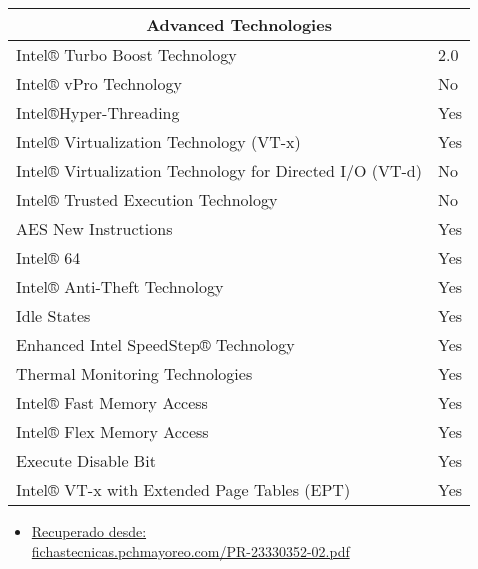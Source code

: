 \begin{table}[H]
  \begin{tabular}{ll}
  \hline
  \multicolumn{2}{|c|}{Advanced Technologies} \\ \hline
  \multicolumn{1}{|l|}{Intel® Turbo Boost Technology} & \multicolumn{1}{l|}{2.0} \\ \hline
  \multicolumn{1}{|l|}{Intel® vPro Technology} & \multicolumn{1}{l|}{No} \\ \hline
  \multicolumn{1}{|l|}{Intel®Hyper-Threading} & \multicolumn{1}{l|}{Yes} \\ \hline
  \multicolumn{1}{|l|}{Intel® Virtualization Technology (VT-x)} & \multicolumn{1}{l|}{Yes} \\ \hline
  \multicolumn{1}{|l|}{Intel® Virtualization Technology for Directed I/O (VT-d)} & \multicolumn{1}{l|}{No} \\ \hline
  \multicolumn{1}{|l|}{Intel® Trusted Execution Technology} & \multicolumn{1}{l|}{No} \\ \hline
  \multicolumn{1}{|l|}{AES New Instructions} & \multicolumn{1}{l|}{Yes} \\ \hline
  \multicolumn{1}{|l|}{Intel® 64} & \multicolumn{1}{l|}{Yes} \\ \hline
  \multicolumn{1}{|l|}{Intel® Anti-Theft Technology} & \multicolumn{1}{l|}{Yes} \\ \hline
  \multicolumn{1}{|l|}{Idle States} & \multicolumn{1}{l|}{Yes} \\ \hline
  \multicolumn{1}{|l|}{Enhanced Intel SpeedStep® Technology} & \multicolumn{1}{l|}{Yes} \\ \hline
  \multicolumn{1}{|l|}{Thermal Monitoring Technologies} & \multicolumn{1}{l|}{Yes} \\ \hline
  \multicolumn{1}{|l|}{Intel® Fast Memory Access} & \multicolumn{1}{l|}{Yes} \\ \hline
  \multicolumn{1}{|l|}{Intel® Flex Memory Access} & \multicolumn{1}{l|}{Yes} \\ \hline
  \multicolumn{1}{|l|}{Execute Disable Bit} & \multicolumn{1}{l|}{Yes} \\ \hline
  \multicolumn{1}{|l|}{Intel® VT-x with Extended Page Tables (EPT)} & \multicolumn{1}{l|}{Yes} \\ \hline
  \end{tabular}
\end{table}

\begin{itemize}
  \item \href{https://ark.intel.com/content/www/us/en/ark/products/65719/intel-core-i7-3770-processor-8m-cache-up-to-3-90-ghz.html}{Recuperado desde:\\ fichastecnicas.pchmayoreo.com/PR-23330352-02.pdf}
\end{itemize}